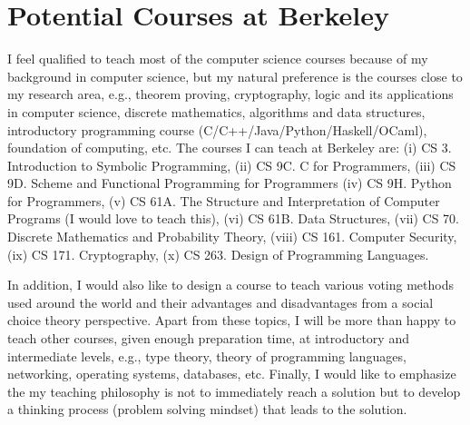 \documentclass[a4paper]{article}
\begin{document}
\section{Potential Courses at Berkeley}
I feel qualified to teach most of the computer science courses 
because of my background in computer science, but 
my natural preference is the courses close to my research 
area, e.g., theorem proving, cryptography, logic 
and its applications in computer science, discrete 
mathematics, algorithms and data structures, 
introductory programming course (C/C++/Java/Python/Haskell/OCaml),
foundation of computing, etc. The courses I can teach at 
Berkeley are: (i) CS 3. Introduction to Symbolic Programming,
(ii) CS 9C. C for Programmers, 
(iii) CS 9D. Scheme and Functional Programming for Programmers 
(iv) CS 9H. Python for Programmers, 
(v) CS 61A. The Structure and Interpretation of Computer Programs (I would love to 
teach this), (vi) CS 61B. Data Structures, 
(vii) CS 70. Discrete Mathematics and Probability Theory, 
(viii) CS 161. Computer Security, (ix) CS 171. Cryptography, 
(x) CS 263. Design of Programming Languages. 



In addition, I would also like to design a course to teach 
various voting methods used around the world and 
their advantages and disadvantages from a social choice theory perspective. 
Apart from these topics, I will 
be more than happy to teach other courses, given enough 
preparation time, at introductory and 
intermediate levels, e.g., type theory, theory of programming 
languages, networking, operating systems, databases, etc.
Finally, I would like to emphasize the 
my teaching philosophy is not to immediately reach a solution but to develop a 
thinking process (problem solving mindset) that leads to the solution. 
\end{document}
